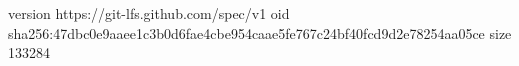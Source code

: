 version https://git-lfs.github.com/spec/v1
oid sha256:47dbc0e9aaee1c3b0d6fae4cbe954caae5fe767c24bf40fcd9d2e78254aa05ce
size 133284
